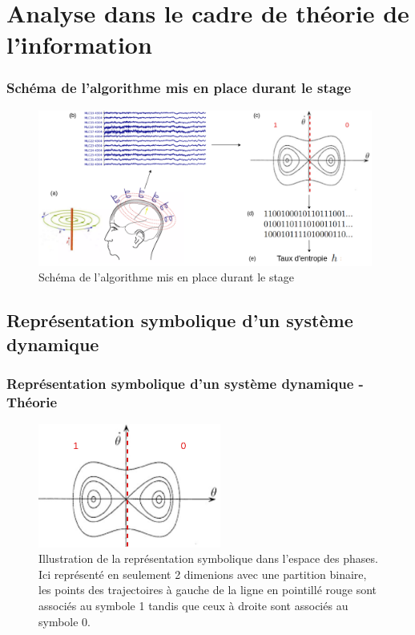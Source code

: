 \documentclass{beamer}
\begin{document}
\section{Analyse dans le cadre de théorie de l'information}

\begin{frame}
\frametitle{Schéma de l'algorithme mis en place durant le stage}
\begin{figure}[!ht]
    \centering
    \includegraphics[width=11cm]{schema_algorithme.png}
    \caption{Schéma de l'algorithme mis en place durant le stage}
    \label{fig0.2}
\end{figure}
\end{frame}

\subsection{Représentation symbolique d'un système dynamique}

\begin{frame}
\frametitle{Représentation symbolique d'un système dynamique - Théorie}
\begin{figure}[!ht]
    \centering
    \includegraphics[width=6cm]{representation_symbolique.png}
    \caption{Illustration de la représentation symbolique dans l'espace des phases. Ici représenté en seulement 2 dimenions avec une partition binaire, les points des trajectoires à gauche de la ligne en pointillé rouge sont associés au symbole 1 tandis que ceux à droite sont associés au symbole 0.}
    \label{fig4.1}
\end{figure}
\end{frame}
\end{document}
